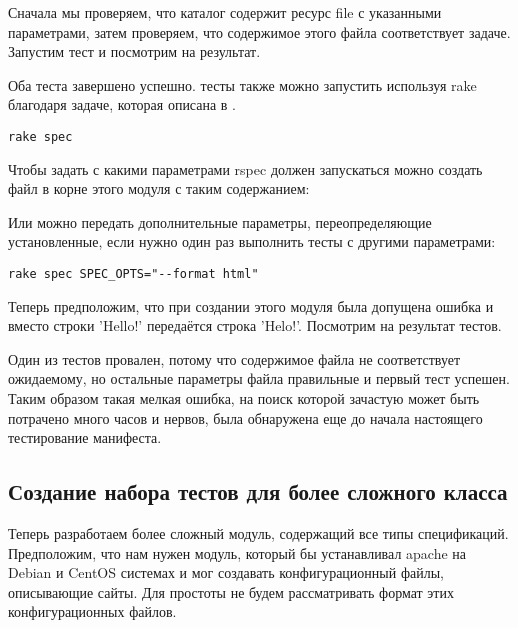 

Сначала мы проверяем, что каталог содержит ресурс file с указанными параметрами, затем проверяем, что содержимое этого файла соответствует задаче. Запустим тест и посмотрим на результат.



Оба теста завершено успешно. тесты также можно запустить используя rake благодаря задаче, которая описана в .

\begin{verbatim}
rake spec
\end{verbatim}

Чтобы задать с какими параметрами rspec должен запускаться можно создать файл  в корне этого модуля с таким содержанием:


Или можно передать дополнительные параметры, переопределяющие установленные, если нужно один раз выполнить тесты с другими параметрами:

\begin{verbatim}
rake spec SPEC_OPTS="--format html"
\end{verbatim}

Теперь предположим, что при создании этого модуля была допущена ошибка и вместо строки 'Hello!' передаётся строка 'Helo!'. Посмотрим на результат тестов.



Один из тестов провален, потому что содержимое файла не соответствует ожидаемому, но остальные параметры файла правильные и первый тест успешен. Таким образом такая мелкая ошибка, на поиск которой зачастую может быть потрачено много часов и нервов, была обнаружена еще до начала настоящего тестирование манифеста.

\subsection{Создание набора тестов для более сложного класса}

Теперь разработаем более сложный модуль, содержащий все типы спецификаций. Предположим, что нам нужен модуль, который бы устанавливал apache на Debian и CentOS системах и мог создавать конфигурационный файлы, описывающие сайты. Для простоты не будем рассматривать формат этих конфигурационных файлов.

